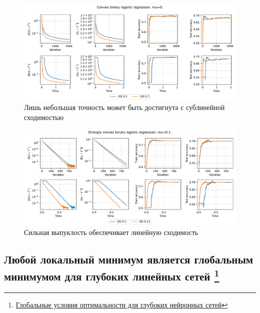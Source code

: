 \documentclass[
  russian,
  letterpaper,
  DIV=11,
  numbers=noendperiod]{scrartcl}
\begin{document}
\begin{figure}[H]

{\centering \includegraphics[width=0.85\linewidth,height=\textheight,keepaspectratio]{logreg_convex.pdf}

}

\caption{Лишь небольшая точность может быть достигнута с сублинейной
сходимостью}

\end{figure}%

\begin{figure}[H]

{\centering \includegraphics[width=0.85\linewidth,height=\textheight,keepaspectratio]{logreg_strongly_convex.pdf}

}

\caption{Сильная выпуклость обеспечивает линейную сходимость}

\end{figure}%

\subsection[Любой локальный минимум является глобальным минимумом для
глубоких линейных сетей ]{\texorpdfstring{Любой локальный минимум
является глобальным минимумом для глубоких линейных сетей
\footnote{\href{https://arxiv.org/abs/1707.02444}{Глобальные условия
  оптимальности для глубоких нейронных сетей}}}{Любой локальный минимум является глобальным минимумом для глубоких линейных сетей }}\label{ux43bux44eux431ux43eux439-ux43bux43eux43aux430ux43bux44cux43dux44bux439-ux43cux438ux43dux438ux43cux443ux43c-ux44fux432ux43bux44fux435ux442ux441ux44f-ux433ux43bux43eux431ux430ux43bux44cux43dux44bux43c-ux43cux438ux43dux438ux43cux443ux43cux43eux43c-ux434ux43bux44f-ux433ux43bux443ux431ux43eux43aux438ux445-ux43bux438ux43dux435ux439ux43dux44bux445-ux441ux435ux442ux435ux439}
\end{document}
